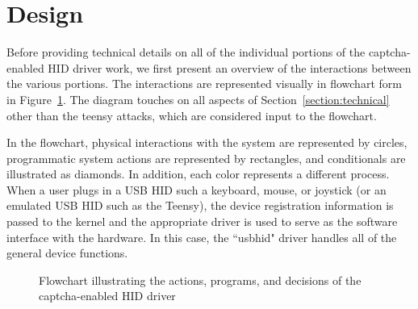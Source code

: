 \documentclass[pagenumbers]{ieee}
\begin{document}
\section{Design}
\label{section:design}

Before providing technical details on all of the individual portions of the captcha-enabled HID driver work, we first present an overview of the interactions between the various portions. The interactions are represented visually in flowchart form in Figure~\ref{fig:flowchart}. The diagram touches on all aspects of Section~\ref{section:technical} other than the teensy attacks, which are considered input to the flowchart.

In the flowchart, physical interactions with the system are represented by circles, programmatic system actions are represented by rectangles, and conditionals are illustrated as diamonds. In addition, each color represents a different process. When a user plugs in a USB HID such a keyboard, mouse, or joystick (or an emulated USB HID such as the Teensy), the device registration information is passed to the kernel and the appropriate driver is used to serve as the software interface with the hardware. In this case, the ``usbhid" driver handles all of the general device functions. 

\begin{figure}[H]
   \caption{Flowchart illustrating the actions, programs, and decisions of the captcha-enabled HID driver}
   \label{fig:flowchart}
\end{figure}
\end{document}
